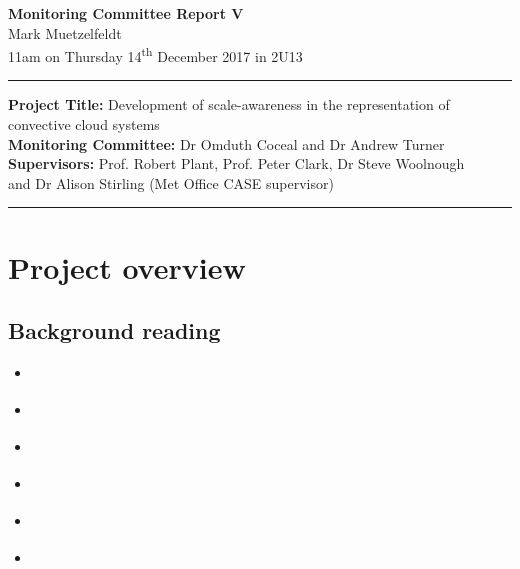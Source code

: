 \documentclass[11pt,a4paper]{article}
\newcommand{\ts}{\textsuperscript}
\begin{document}

\begin{center}
    \Large{\textbf{Monitoring Committee Report V}}\\[0.1cm]
    \large{Mark Muetzelfeldt}\\
    \normalsize{11am on Thursday 14\ts{th} December 2017 in 2U13}\\[0.1cm]		
    \rule{\textwidth}{0.2mm}
    \textbf{Project Title: }Development of scale-awareness in the representation of
    convective cloud systems\\
    \textbf{Monitoring Committee: }Dr Omduth Coceal and  Dr Andrew Turner\\
    \textbf{Supervisors: }Prof. Robert Plant, Prof. Peter Clark, Dr Steve Woolnough \\
    and Dr Alison Stirling (Met Office CASE supervisor)\\
    \rule{\textwidth}{0.2mm}
\end{center}

\section{Project overview}
\label{sec:Project Overview}
 

\subsection{Background reading}
\label{sec:Background reading}

\begin{itemize}
  \item \cite{mapes2011parameterizing}
  \item \cite{tompkins2017organization}
  \item \cite{willett2017simple}
  \item \cite{houchi2010comparison}
  \item \cite{aiyyer2006climatology}
  \item \cite{davies2009simple}
\end{itemize}
\end{document}
